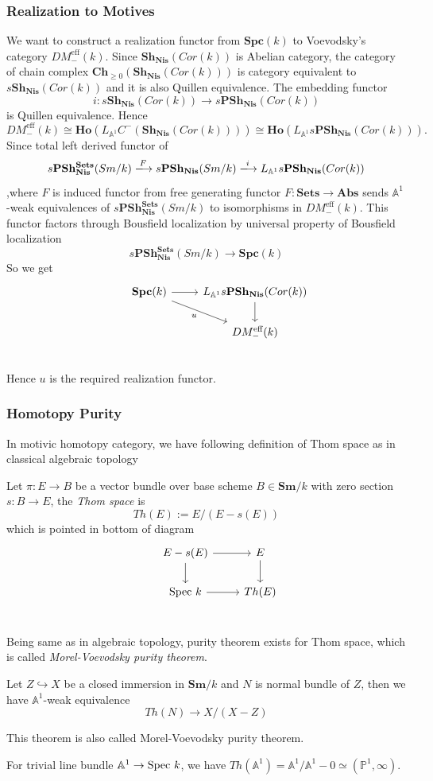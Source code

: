 \documentclass[b5paper,10pt]{article}
\begin{document}
\subsubsection{Realization to Motives}
We want to construct a realization functor from $\mathbf{Spc}(k)$ to Voevodsky's category $DM_{-}^{\text{eff}}(k)$.
Since $\mathbf{Sh_{Nis}}(Cor(k))$ is Abelian category, the category of chain complex $\mathbf{Ch}_{\geq 0}(\mathbf{Sh_{Nis}}(Cor(k)))$ is category equivalent to $s\mathbf{Sh_{Nis}}(Cor(k))$ and it is also Quillen equivalence. The embedding functor
\[
i \colon s\mathbf{Sh_{Nis}}(Cor(k)) \to s\mathbf{PSh_{Nis}}(Cor(k))
\]
is Quillen equivalence. 
Hence \[DM_{-}^{\text{eff}}(k) \cong \mathbf{Ho}(L_{\mathbb{A}^1}C^{-}(\mathbf{Sh_{Nis}}(Cor(k)))) \cong
 \mathbf{Ho}(L_{\mathbb{A}^1}s\mathbf{PSh_{Nis}}(Cor(k))).\]
 Since total left derived functor of 
 \[
 s\mathbf{PSh_{Nis}^{Sets}}(Sm/k) 
 \xlongrightarrow{F} s\mathbf{PSh_{Nis}}(Sm/k) \xlongrightarrow{i} L_{\mathbb{A}^1}s\mathbf{PSh_{Nis}}(Cor(k))
 \]
,where $F$ is induced functor from free generating functor $F \colon \mathbf{Sets} \to \mathbf{Abs}$ sends $\mathbb{A}^1$-weak equivalences of $s\mathbf{PSh_{Nis}^{Sets}}(Sm/k)$ to isomorphisms in  $DM_{-}^{\text{eff}}(k)$. This functor factors through Bousfield localization by universal property of Bousfield localization
\[
 s\mathbf{PSh_{Nis}^{Sets}}(Sm/k) \to \mathbf{Spc}(k)
\]
So we get 
\[
\begin{tikzcd}
&\mathbf{Spc}(k) \arrow[r] \arrow[rd,"u"']& L_{\mathbb{A}^1}s\mathbf{PSh_{Nis}}(Cor(k)) \arrow[d]\\
& & DM_{-}^{\text{eff}}(k)\\
\end{tikzcd}
\]
 Hence $u$ is the required realization functor.
\subsubsection{Homotopy Purity}
In motivic homotopy category, we have following definition of Thom space as in classical algebraic topology
\begin{secdefn}
	Let $\pi \colon E \to B$ be a vector bundle over base scheme $B \in \mathbf{Sm}/k$ with zero section $s: B \to E$, the \emph{Thom space} is
	\[
	Th(E):= E/(E-s(E))
	\]
	which is pointed in bottom of diagram
	\[
	\begin{tikzcd}
	&E-s(E) \ar[r] \ar[d] & E \ar[d]\\
	&\spec k \ar[r]& Th(E)\\
	\end{tikzcd}
	\]
\end{secdefn}
Being same as in algebraic topology, purity theorem exists for Thom space, which is called \emph{Morel-Voevodsky purity theorem}.
\begin{secthm}
	Let $Z \hookrightarrow X$ be a closed immersion in $\mathbf{Sm}/k$ and $N$ is normal bundle of $Z$, then we have $\mathbb{A}^1$-weak equivalence
	\[
	Th(N) \to X/(X-Z)
	\]
\end{secthm}
This theorem is also called Morel-Voevodsky purity theorem.
\begin{ex}
	For trivial line bundle $\mathbb{A}^1 \to \text{Spec } k$, we have $Th(\mathbb{A}^1)= \mathbb{A}^1/\mathbb{A}^1 -0 \simeq (\mathbb{P}^1,\infty)$. 
\end{ex}
\end{document}
